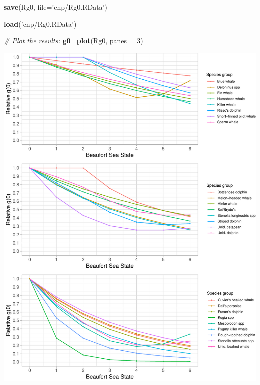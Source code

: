 \documentclass[
]{book}
\newenvironment{Shaded}{\begin{snugshade}}{\end{snugshade}}
\newcommand{\CommentTok}[1]{\textcolor[rgb]{0.56,0.35,0.01}{\textit{#1}}}
\newcommand{\DataTypeTok}[1]{\textcolor[rgb]{0.13,0.29,0.53}{#1}}
\newcommand{\DecValTok}[1]{\textcolor[rgb]{0.00,0.00,0.81}{#1}}
\newcommand{\KeywordTok}[1]{\textcolor[rgb]{0.13,0.29,0.53}{\textbf{#1}}}
\newcommand{\NormalTok}[1]{#1}
\newcommand{\StringTok}[1]{\textcolor[rgb]{0.31,0.60,0.02}{#1}}
\begin{document}
\begin{Shaded}
\begin{Highlighting}[]
\KeywordTok{save}\NormalTok{(Rg0, }\DataTypeTok{file=}\StringTok{'cnp/Rg0.RData'}\NormalTok{)}
\end{Highlighting}
\end{Shaded}

\begin{Shaded}
\begin{Highlighting}[]
\KeywordTok{load}\NormalTok{(}\StringTok{'cnp/Rg0.RData'}\NormalTok{)}
\end{Highlighting}
\end{Shaded}

\begin{Shaded}
\begin{Highlighting}[]
\CommentTok{# Plot the results: }
\KeywordTok{g0_plot}\NormalTok{(Rg0, }\DataTypeTok{panes =} \DecValTok{3}\NormalTok{)}
\end{Highlighting}
\end{Shaded}

\includegraphics{figures/unnamed-chunk-406-1.pdf}
\end{document}
